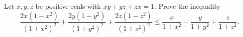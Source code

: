 Let $x, y, z$ be positive reals with $xy + yz + zx = 1$. Prove the inequality
\[ \frac{2x(1 - x^2)}{(1 + x^2)^2} + \frac{2y(1 - y^2)}{(1 + y^2)^2} + \frac{2z(1 - z^2)}{(1 + z^2)^2} \leq \frac{x}{1 + x^2} + \frac{y}{1 + y^2} + \frac{z}{1 + z^2}. \]
